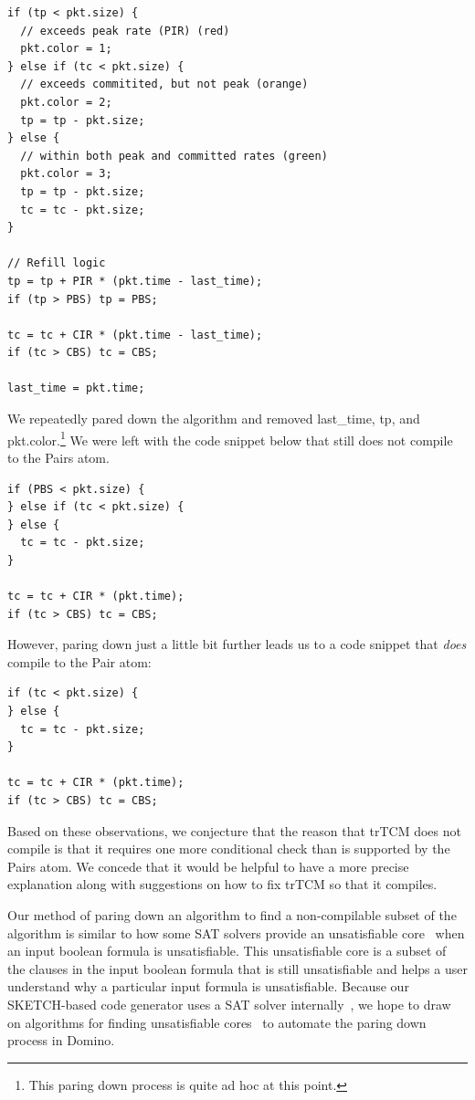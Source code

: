 \begin{verbatim}
if (tp < pkt.size) {
  // exceeds peak rate (PIR) (red)
  pkt.color = 1;
} else if (tc < pkt.size) {
  // exceeds commitited, but not peak (orange)
  pkt.color = 2;
  tp = tp - pkt.size;
} else {
  // within both peak and committed rates (green)
  pkt.color = 3;
  tp = tp - pkt.size;
  tc = tc - pkt.size;
}

// Refill logic
tp = tp + PIR * (pkt.time - last_time);
if (tp > PBS) tp = PBS;

tc = tc + CIR * (pkt.time - last_time);
if (tc > CBS) tc = CBS;

last_time = pkt.time;
\end{verbatim}

We repeatedly pared down the algorithm and removed last\_time, tp, and
pkt.color.\footnote{This paring down process is quite ad hoc at this point.} We
were left with the code snippet below that still does not compile to the Pairs
atom.

\begin{verbatim}
if (PBS < pkt.size) {
} else if (tc < pkt.size) {
} else {
  tc = tc - pkt.size;
}

tc = tc + CIR * (pkt.time);
if (tc > CBS) tc = CBS;
\end{verbatim}

However, paring down just a little bit further leads us to a code snippet that
{\em does} compile to the Pair atom:

\begin{verbatim}
if (tc < pkt.size) {
} else {
  tc = tc - pkt.size;
}

tc = tc + CIR * (pkt.time);
if (tc > CBS) tc = CBS;
\end{verbatim}

Based on these observations, we conjecture that the reason that trTCM does not
compile is that it requires one more conditional check than is supported by the
Pairs atom. We concede that it would be helpful to have a more precise
explanation along with suggestions on how to fix trTCM so that it compiles.

Our method of paring down an algorithm to find a non-compilable subset of the
algorithm is similar to how some SAT solvers provide an unsatisfiable
core~\cite{unsat_core} when an input boolean formula is unsatisfiable. This
unsatisfiable core is a subset of the clauses in the input boolean formula that
is still unsatisfiable and helps a user understand why a particular input
formula is unsatisfiable. Because our SKETCH-based code generator uses a SAT
solver internally~\cite{sketch_asplos}, we hope to draw on algorithms for
finding unsatisfiable cores~\cite{unsat_core} to automate the paring down
process in Domino.

